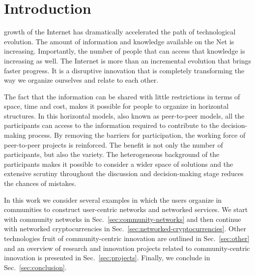 \documentclass[journal]{IEEEtran}
\begin{document}
%
\IEEEpeerreviewmaketitle



\section{Introduction}
% 
% 
% 
% 
 growth of the Internet has dramatically accelerated the path of technological evolution.
The amount of information and knowledge available on the Net is increasing.
Importantly,  the number of people that can access that knowledge is increasing as well.
The Internet is more than an incremental evolution that brings faster progress.
It is a disruptive innovation that is completely transforming the way we organize ourselves and relate to each other.

The fact that the information can be shared with little restrictions in terms of space, time and cost, makes it possible for people to organize in horizontal structures.
In this horizontal models, also known as peer-to-peer models, all the participants can access to the information required to contribute to the decision-making process.
By removing the barriers for participation, the working force of peer-to-peer projects is reinforced.
The benefit is not only the number of participants, but also the variety.
The heterogeneous background of the participants makes it possible to consider a wider space of solutions and the extensive scrutiny throughout the discussion and decision-making stage reduces the chances of mistakes.

In this work we consider several examples in which the users organize in communities to construct user-centric networks and networked services.
We start with community networks in Sec.~\ref{sec:community-networks} and then continue with networked cryptocurrencies in Sec.~\ref{sec:networked-cryptocurrencies}.
Other technologies fruit of community-centric innovation are outlined in Sec.~\ref{sec:other} and an overview of research and innovation projects related to community-centric innovation is presented in Sec.~\ref{sec:projects}.
Finally, we conclude in Sec.~\ref{sec:conclusion}.
\end{document}
